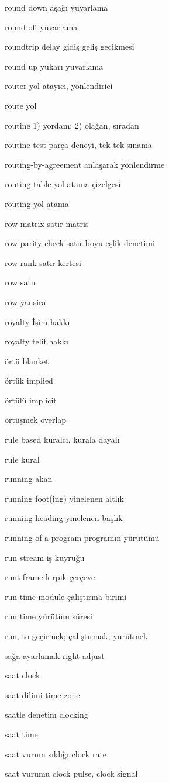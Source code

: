 \documentclass[12pt,fleqn]{article}\usepackage{../../common}
\begin{document}
round down aşağı yuvarlama

round off yuvarlama

roundtrip delay gidiş geliş gecikmesi

round up yukarı yuvarlama

router yol atayıcı, yönlendirici

route yol

routine 1) yordam; 2) olağan, sıradan

routine test parça deneyi, tek tek sınama

routing-by-agreement anlaşarak yönlendirme

routing table yol atama çizelgesi

routing yol atama

row matrix satır matris

row parity check satır boyu eşlik denetimi

row rank satır kertesi

row satır

row yansira

royalty İsim hakkı

royalty telif hakkı

örtü blanket

örtük implied

örtülü implicit

örtüşmek overlap

rule based kuralcı, kurala dayalı

rule kural

running akan

running foot(ing) yinelenen altlık

running heading yinelenen başlık

running of a program programın yürütümü

run stream iş kuyruğu

runt frame kırpık çerçeve

run time module çalıştırma birimi

run time yürütüm süresi

run, to geçirmek; çalıştırmak; yürütmek

sağa ayarlamak right adjust

saat clock

saat dilimi time zone

saatle denetim clocking

saat time

saat vurum sıklığı clock rate

saat vurumu clock pulse, clock signal
\end{document}
